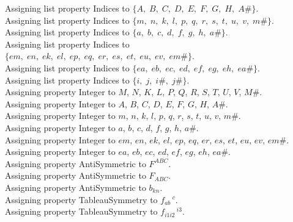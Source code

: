 \documentclass[11pt]{article}
\begin{document}
Assigning list property Indices to $\{A,\; B,\; C,\; D,\; E,\; F,\; G,\; H,\; A\#\}$.
\\
Assigning list property Indices to $\{m,\; n,\; k,\; l,\; p,\; q,\; r,\; s,\; t,\; u,\; v,\; m\#\}$.
\\
Assigning list property Indices to $\{a,\; b,\; c,\; d,\; f,\; g,\; h,\; a\#\}$.
\\
Assigning list property Indices to $\{em,\; en,\; ek,\; el,\; ep,\; eq,\; er,\; es,\; et,\; eu,\; ev,\; em\#\}$.
\\
Assigning list property Indices to $\{ea,\; eb,\; ec,\; ed,\; ef,\; eg,\; eh,\; ea\#\}$.
\\
Assigning list property Indices to $\{i,\; j,\; i\#,\; j\#\}$.
\\
Assigning property Integer to $M$, $N$, $K$, $L$, $P$, $Q$, $R$, $S$, $T$, $U$, $V$, $M\#$.
\\
Assigning property Integer to $A$, $B$, $C$, $D$, $E$, $F$, $G$, $H$, $A\#$.
\\
Assigning property Integer to $m$, $n$, $k$, $l$, $p$, $q$, $r$, $s$, $t$, $u$, $v$, $m\#$.
\\
Assigning property Integer to $a$, $b$, $c$, $d$, $f$, $g$, $h$, $a\#$.
\\
Assigning property Integer to $em$, $en$, $ek$, $el$, $ep$, $eq$, $er$, $es$, $et$, $eu$, $ev$, $em\#$.
\\
Assigning property Integer to $ea$, $eb$, $ec$, $ed$, $ef$, $eg$, $eh$, $ea\#$.
\\
Assigning property AntiSymmetric to ${F}^{A B C}$.
\\
Assigning property AntiSymmetric to ${F}_{A B C}$.
\\
Assigning property AntiSymmetric to ${b}_{k n}$.
\\
Assigning property TableauSymmetry to ${f}_{a b}\,^{c}$.
\\
Assigning property TableauSymmetry to ${f}_{i1 i2}\,^{i3}$.
\end{document}

